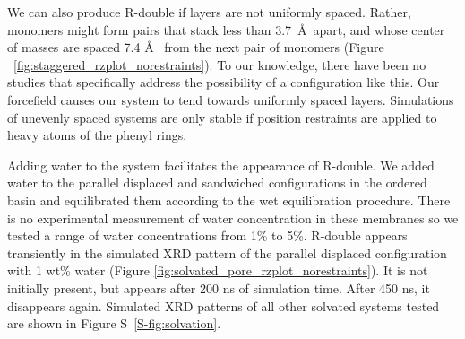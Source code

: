 \documentclass[journal=jpcbfk,manusciprt=article]{achemso}
\begin{document}
  We can also produce R-double if layers are not uniformly spaced. Rather, monomers might form 
  pairs that stack less than 3.7~\AA~apart, and whose center of masses are spaced 7.4 \AA~ 
  from the next pair of monomers (Figure ~\ref{fig:staggered_rzplot_norestraints}). To our 
  knowledge, there have been no studies that specifically address the possibility of a
  configuration like this. Our forcefield causes our system to tend towards uniformly spaced
  layers. Simulations of unevenly spaced systems are only stable if position restraints
  are applied to heavy atoms of the phenyl rings.
  
  Adding water to the system facilitates the appearance of R-double. We added water to the 
  parallel displaced and sandwiched configurations in the ordered basin and equilibrated them
  according to the wet equilibration procedure. There is no experimental measurement of 
  water concentration in these membranes so we tested a range of water concentrations from
  1\% to 5\%. R-double appears transiently in the simulated XRD pattern of the parallel 
  displaced configuration with 1 wt\% water (Figure \ref{fig:solvated_pore_rzplot_norestraints}). It is
  not initially present, but appears after 200 ns of simulation time. After 450 ns, it 
  disappears again. Simulated XRD patterns of all other solvated systems tested are shown 
  in Figure S~\ref{S-fig:solvation}.
  
\end{document}
